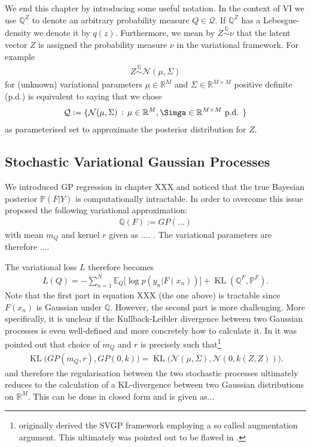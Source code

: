 \documentclass{article}
\newcommand{\bbP}{\mathbb{P}}
\newcommand{\bbR}{\mathbb{R}}
\newcommand{\bbE}{\mathbb{E}}
\newcommand{\bbQ}{\mathbb{Q}}
\newcommand{\KL}{\operatorname{KL}}
\numberwithin{equation}{section}
\begin{document}
We end this chapter by introducing some useful notation. In the context of VI we use $\bbQ^Z$ to denote an arbitrary probability measure $Q \in \mathcal{Q}$. If $\bbQ^Z$ has a Lebesgue-density we denote it by $q(z)$. Furthermore, we mean by $Z \overset{\bbQ}{\sim} \nu$ that the latent vector $Z$ is assigned the probability measure $\nu$ in the variational framework. For example
\begin{align}
    Z \overset{\bbQ}{\sim} \mathcal{N}( \mu, \Sigma)
\end{align}
for (unknown) variational parameters $\mu \in \bbR^M$ and $\Sigma \in \bbR^{M \times M} $ positive definite (p.d.) is equivalent to saying that we chose
\begin{align}
    \mathcal{Q}:= \{ \mathcal{N}(\mu, \Sigma) \, : \, \mu \in \bbR^M, \Simga \in \bbR^{M \times M} \text{ p.d. } \}
\end{align}
as parameterised set to approximate the posterior distribution for $Z$.

\subsection{Stochastic Variational Gaussian Processes}\label{sec:svgp}
We introduced GP regression in chapter XXX and noticed that the true Bayesian posterior $\bbP(F|Y)$ is computationally intractable. In order to overcome this issue \citet{titsias2009variational} proposed the following variational approximation:
\begin{align}
    \bbQ(F) := GP( ...)
\end{align}
with mean $m_Q$ and kernel $r$ given as .... . The variational parameters are therefore ....

The variational loss $L$ therefore becomes
\begin{align}
    L(Q) = - \sum_{n=1}^N \bbE_Q \big[ \log p(y_n | F(x_n)) ] + \KL(\bbQ^F, \bbP^F).
\end{align}
Note that the first part in equation XXX (the one above) is tractable since $F(x_n)$ is Gaussian under $\bbQ$. However, the second part is more challenging. More specifically, it is unclear if the Kullback-Leibler divergence between two Gaussian processes is even well-defined and more concretely how to calculate it. In \citet{matthews2016sparse} it was pointed out that \citet{titsias2009variational} choice of $m_Q$ and $r$ is precisely such that\footnote{\citet{titsias2009variational} originally derived the SVGP framework employing a so called augmentation argument. This ultimately was pointed out to be flawed in \citet{matthews2016sparse}.  }
\begin{align}
    \KL\Big( GP(m_Q,r) , GP(0,k) \Big) = \KL\Big( \mathcal{N}(\mu, \Sigma),  \mathcal{N}(0, k(Z,Z)) \Big).
\end{align}
and therefore the regularisation between the two stochastic processes ultimately reduces to the calculation of a KL-divergence between two Gaussian distributions on $\bbR^M$. This can be done in closed form and is given as...
\end{document}
